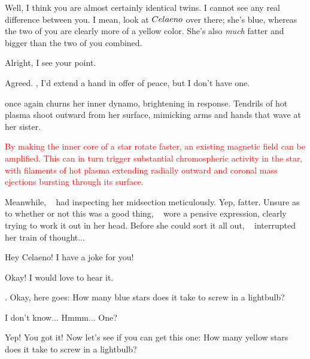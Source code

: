 \documentclass[main.tex]{subfiles}
\begin{document}
\par \Maia Well, I think you are almost certainly identical twins.  I cannot see any real difference between you.  I mean, look at $Celaeno$ over there; she's blue, whereas the two of you are clearly more of a yellow color.  She's also \textit{much} fatter and bigger than the two of you combined.  

\par \Celaeno Alright, I see your point.

\par \Taygete Agreed.  \rmalcyone, I'd extend a hand in offer of peace, but I don't have one.

\par \nar \rmtaygete once again churns her inner dynamo, brightening in response.  Tendrils of hot plasma shoot outward from her surface, mimicking arms and hands that wave at her sister.

\begin{tcolorbox}[sharp corners, colback=red!30, colframe=red!80!blue, title=Magnetic Fields and Dynamos]
\par \textcolor{red} {By making the inner core of a star rotate faster, an existing magnetic field can be amplified.   This can in turn trigger substantial chromospheric activity in the star, with filaments of hot plasma extending radially outward and coronal mass ejections bursting through its surface.}  
\end{tcolorbox}

\par \nar Meanwhile, \rmcelaeno~ had inspecting her midsection meticulously.  Yep, fatter.  Unsure as to whether or not this was a good thing, \rmcelaeno~ wore a pensive expression, clearly trying to work it out in her head.  Before she could sort it all out, \rmtaygete~ interrupted her train of thought...

\par \Taygete Hey Celaeno!  I have a joke for you!

\par \Celaeno Okay!  I would love to hear it.

\par \Taygete. Okay, here goes:  How many blue stars does it take to screw in a lightbulb?

\par \Celaeno I don't know... Hmmm... One?

\par \Taygete Yep!  You got it!  Now let's see if you can get this one:  How many yellow stars does it take to screw in a lightbulb?
\end{document}
